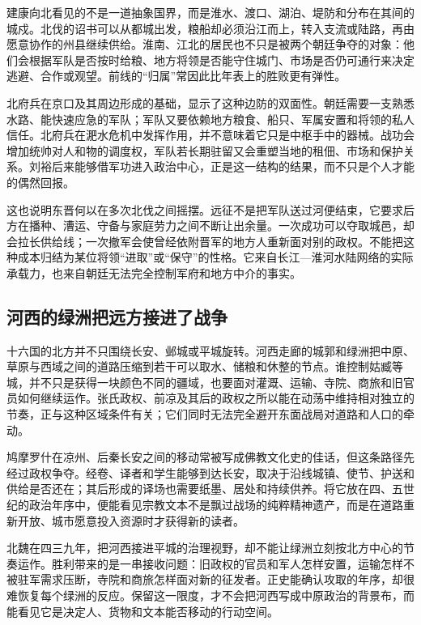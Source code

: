 建康向北看见的不是一道抽象国界，而是淮水、渡口、湖泊、堤防和分布在其间的城戍。北伐的诏书可以从都城出发，粮船却必须沿江而上，转入支流或陆路，再由愿意协作的州县继续供给。淮南、江北的居民也不只是被两个朝廷争夺的对象：他们会根据军队是否按时给粮、地方将领是否能守住城门、市场是否仍可通行来决定逃避、合作或观望。前线的“归属”常因此比年表上的胜败更有弹性。

北府兵在京口及其周边形成的基础，显示了这种边防的双面性。朝廷需要一支熟悉水路、能快速应急的军队；军队又要依赖地方粮食、船只、军属安置和将领的私人信任。北府兵在淝水危机中发挥作用，并不意味着它只是中枢手中的器械。战功会增加统帅对人和物的调度权，军队若长期驻留又会重塑当地的租佃、市场和保护关系。刘裕后来能够借军功进入政治中心，正是这一结构的结果，而不只是个人才能的偶然回报。

这也说明东晋何以在多次北伐之间摇摆。远征不是把军队送过河便结束，它要求后方在播种、漕运、守备与家庭劳力之间不断让出余量。一次成功可以夺取城邑，却会拉长供给线；一次撤军会使曾经依附晋军的地方人重新面对别的政权。不能把这种成本归结为某位将领“进取”或“保守”的性格。它来自长江—淮河水陆网络的实际承载力，也来自朝廷无法完全控制军府和地方中介的事实。

\subsection{河西的绿洲把远方接进了战争}

十六国的北方并不只围绕长安、邺城或平城旋转。河西走廊的城郭和绿洲把中原、草原与西域之间的道路压缩到若干可以取水、储粮和休整的节点。谁控制姑臧等城，并不只是获得一块颜色不同的疆域，也要面对灌溉、运输、寺院、商旅和旧官员如何继续运作。张氏政权、前凉及其后的政权之所以能在动荡中维持相对独立的节奏，正与这种区域条件有关；它们同时无法完全避开东面战局对道路和人口的牵动。

鸠摩罗什在凉州、后秦长安之间的移动常被写成佛教文化史的佳话，但这条路径先经过政权争夺。经卷、译者和学生能够到达长安，取决于沿线城镇、使节、护送和供给是否还在；其后形成的译场也需要纸墨、居处和持续供养。将它放在四、五世纪的政治年序中，便能看见宗教文本不是飘过战场的纯粹精神遗产，而是在道路重新开放、城市愿意投入资源时才获得新的读者。

北魏在四三九年，把河西接进平城的治理视野，却不能让绿洲立刻按北方中心的节奏运作。胜利带来的是一串接收问题：旧政权的官员和军人怎样安置，运输怎样不被驻军需求压断，寺院和商旅怎样面对新的征发者。正史能确认攻取的年序，却很难恢复每个绿洲的反应。保留这一限度，才不会把河西写成中原政治的背景布，而能看见它是决定人、货物和文本能否移动的行动空间。

